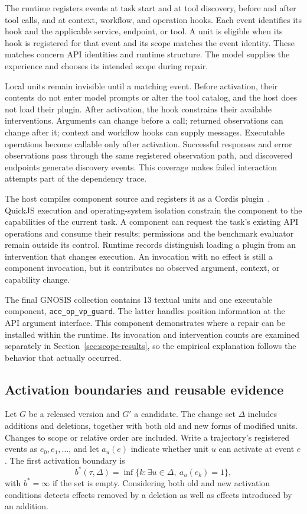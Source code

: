 \documentclass{ecai}
\begin{document}
The runtime registers events at task start and at tool discovery, before and after tool calls, and at context, workflow, and operation hooks. Each event identifies its hook and the applicable service, endpoint, or tool. A unit is eligible when its hook is registered for that event and its scope matches the event identity. These matches concern API identities and runtime structure. The model supplies the experience and chooses its intended scope during repair.

Local units remain invisible until a matching event. Before activation, their contents do not enter model prompts or alter the tool catalog, and the host does not load their plugin. After activation, the hook constrains their available interventions. Arguments can change before a call; returned observations can change after it; context and workflow hooks can supply messages. Executable operations become callable only after activation. Successful responses and error observations pass through the same registered observation path, and discovered endpoints generate discovery events. This coverage makes failed interaction attempts part of the dependency trace.

The host compiles component source and registers it as a Cordis plugin~\cite{cordis}. QuickJS execution and operating-system isolation constrain the component to the capabilities of the current task. A component can request the task's existing API operations and consume their results; permissions and the benchmark evaluator remain outside its control. Runtime records distinguish loading a plugin from an intervention that changes execution. An invocation with no effect is still a component invocation, but it contributes no observed argument, context, or capability change.

The final GNOSIS collection contains 13 textual units and one executable component, \texttt{ace\_op\_vp\_guard}. The latter handles position information at the API argument interface. This component demonstrates where a repair can be installed within the runtime. Its invocation and intervention counts are examined separately in Section~\ref{sec:scope-results}, so the empirical explanation follows the behavior that actually occurred.

\subsection{Activation boundaries and reusable evidence}
\label{sec:boundary}

Let $G$ be a released version and $G'$ a candidate. The change set $\Delta$ includes additions and deletions, together with both old and new forms of modified units. Changes to scope or relative order are included. Write a trajectory's registered events as $e_0,e_1,\ldots$, and let $a_u(e)$ indicate whether unit $u$ can activate at event $e$. The first activation boundary is
\begin{equation}
b^*(\tau,\Delta)=\inf\{k:\exists u\in\Delta,\ a_u(e_k)=1\},
\label{eq:boundary}
\end{equation}
with $b^*=\infty$ if the set is empty. Considering both old and new activation conditions detects effects removed by a deletion as well as effects introduced by an addition.
\end{document}
